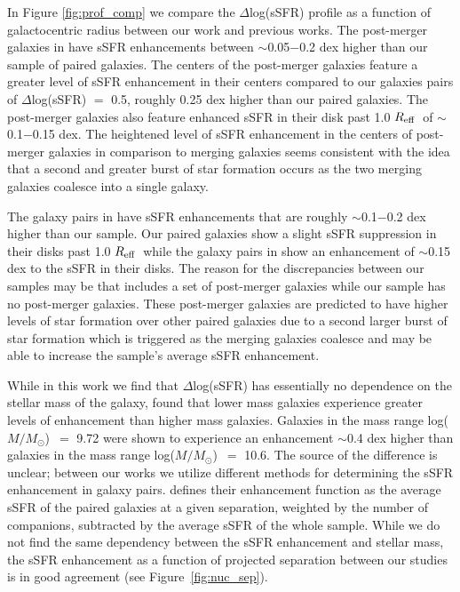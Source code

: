\documentclass[iop,revtex4,twocolumn,apj,numberedappendix,appendixfloats]{emulateapj}
\newcommand{\reff}{$R_{\rm eff}$}
\newcommand{\logm}{log($M/M_{\odot}$)}
\begin{document}
In Figure \ref{fig:prof_comp} we compare the $\Delta$log(sSFR) profile as a function of galactocentric radius between our work and previous works. The post-merger galaxies in \citet{Thorp:2019} have sSFR enhancements between $\sim$0.05$-$0.2 dex higher than our sample of paired galaxies. The centers of the post-merger galaxies feature a greater level of sSFR enhancement in their centers compared to our galaxies pairs of $\Delta$log(sSFR) $=$ 0.5, roughly 0.25 dex higher than our paired galaxies. The post-merger galaxies also feature enhanced sSFR in their disk past 1.0 \reff\ of $\sim$0.1$-$0.15 dex. The heightened level of sSFR enhancement in the centers of post-merger galaxies in comparison to merging galaxies seems consistent with the idea that a second and greater burst of star formation occurs as the two merging galaxies coalesce into a single galaxy. 

The galaxy pairs in \citet{Pan:2019} have sSFR enhancements that are roughly $\sim$0.1$-$0.2 dex higher than our sample. Our paired galaxies show a slight sSFR suppression in their disks past 1.0 \reff\ while the galaxy pairs in \citet{Pan:2019} show an enhancement of $\sim$0.15 dex to the sSFR in their disks. The reason for the discrepancies between our samples may be that \citet{Pan:2019} includes a set of post-merger galaxies while our sample has no post-merger galaxies. These post-merger galaxies are predicted to have higher levels of star formation over other paired galaxies due to a second larger burst of star formation which is triggered as the merging galaxies coalesce and may be able to increase the sample's average sSFR enhancement. 

While in this work we find that $\Delta$log(sSFR) has essentially no dependence on the stellar mass of the galaxy, \citet{Li:2008} found that lower mass galaxies experience greater levels of enhancement than higher mass galaxies. Galaxies in the mass range \logm\ $=$ 9.72 were shown to experience an enhancement $\sim$0.4 dex higher than galaxies in the mass range \logm\ $=$ 10.6. The source of the difference is unclear; between our works we utilize different methods for determining the sSFR enhancement in galaxy pairs. \citet{Li:2008} defines their enhancement function as the average sSFR of the paired galaxies at a given separation, weighted by the number of companions, subtracted by the average sSFR of the whole sample. While we do not find the same dependency between the sSFR enhancement and stellar mass, the sSFR enhancement as a function of projected separation between our studies is in good agreement (see Figure~\ref{fig:nuc_sep}).
\end{document}
